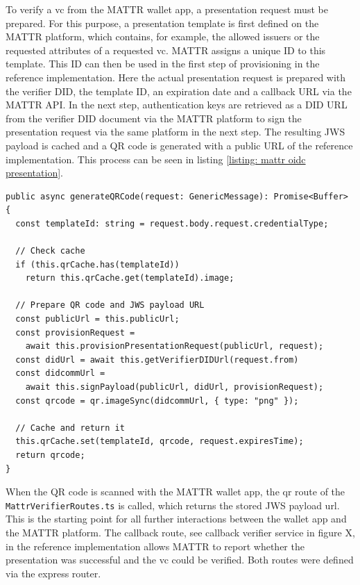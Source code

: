     To verify a \ac{vc} from the MATTR wallet app, a presentation request must be prepared. For this purpose, a presentation template is first defined on the MATTR platform, which contains, for example, the allowed issuers or the requested attributes of a requested \ac{vc}. MATTR assigns a unique ID to this template. This ID can then be used in the first step of provisioning in the reference implementation. Here the actual presentation request is prepared with the verifier DID, the template ID, an expiration date and a callback URL via the MATTR API. In the next step, authentication keys are retrieved as a DID URL from the verifier DID document via the MATTR platform to sign the presentation request via the same platform in the next step. The resulting JWS payload is cached and a QR code is generated with a public URL of the reference implementation. This process can be seen in listing \ref{listing: mattr oidc presentation}.
    \newline
\begin{lstlisting}[style=ES6, caption=Generate QR code for OIDC presentation reqest, label={listing: mattr oidc presentation}]
public async generateQRCode(request: GenericMessage): Promise<Buffer> {
  const templateId: string = request.body.request.credentialType;
  
  // Check cache
  if (this.qrCache.has(templateId)) 
    return this.qrCache.get(templateId).image;

  // Prepare QR code and JWS payload URL
  const publicUrl = this.publicUrl;
  const provisionRequest = 
    await this.provisionPresentationRequest(publicUrl, request);
  const didUrl = await this.getVerifierDIDUrl(request.from)
  const didcommUrl = 
    await this.signPayload(publicUrl, didUrl, provisionRequest); 
  const qrcode = qr.imageSync(didcommUrl, { type: "png" });
    
  // Cache and return it
  this.qrCache.set(templateId, qrcode, request.expiresTime);
  return qrcode;
}\end{lstlisting}
    
        When the QR code is scanned with the MATTR wallet app, the qr route of the \texttt{MattrVerifierRoutes.ts} is called, which returns the stored JWS payload url. This is the starting point for all further interactions between the wallet app and the MATTR platform. The callback route, see callback verifier service in figure X, in the reference implementation allows MATTR to report whether the presentation was successful and the \ac{vc} could be verified. Both routes were defined via the express router.
        
